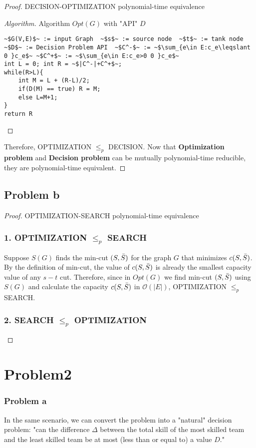 \documentclass[openany]{article}
\begin{document}
\begin{proof}{}{DECISION-OPTIMIZATION polynomial-time equivalence}
\begin{proof}[Algorithm]{}
		\renewcommand{\qedsymbol}{}
		Algorithm $Opt(G)$ with "API" $D$
		\begin{lstlisting}[basicstyle=\fontsize{8}{9}\selectfont\ttfamily]
~$G(V,E)$~ := input Graph  ~$s$~ := source node  ~$t$~ := tank node
~$D$~ := Decision Problem API  ~$C^-$~ := ~$\sum_{e\in E:c_e\leqslant 0 }c_e$~ ~$C^+$~ := ~$\sum_{e\in E:c_e>0 0 }c_e$~
int L = 0; int R = ~$|C^-|+C^+$~;
while(R>L){
    int M = L + (R-L)/2;
    if(D(M) == true) R = M;
    else L=M+1;
}
return R
		\end{lstlisting} 
\end{proof}

Therefore,   OPTIMIZATION $\leqslant_p$ DECISION.
Now that \textbf{Optimization problem} and \textbf{Decision problem} can be mutually polynomial-time reducible, they are polynomial-time equivalent.
\end{proof}

\subsection*{Problem b}
\begin{proof}{}{OPTIMIZATION-SEARCH polynomial-time equivalence}
    
\subsubsection*{1. OPTIMIZATION $\leqslant_p$ SEARCH}
Suppose $S(G)$ finds the min-cut $(S,\Bar{S})$ for the graph $G$ that minimizes $c(S,\Bar{S})$. By the definition of min-cut, the value of $c(S,\Bar{S})$ is already the smallest capacity value of any $s-t$ cut. Therefore, since in $Opt(G)$ we find min-cut $(S,\Bar{S})$ using $S(G)$ and calculate the capacity $c(S,\Bar{S})$ in $\mathcal{O}(|E|)$,  OPTIMIZATION $\leqslant_p$ SEARCH.

\subsubsection*{2. SEARCH $\leqslant_p$ OPTIMIZATION} 

\end{proof}


\section*{Problem2}
\subsubsection*{Problem a}
In the same scenario, we can convert the problem into a "natural" decision problem: "can the difference $\Delta$ between the total skill of the most skilled team and the least skilled team be at most (less than or equal to) a value $D$." 
\end{document}
